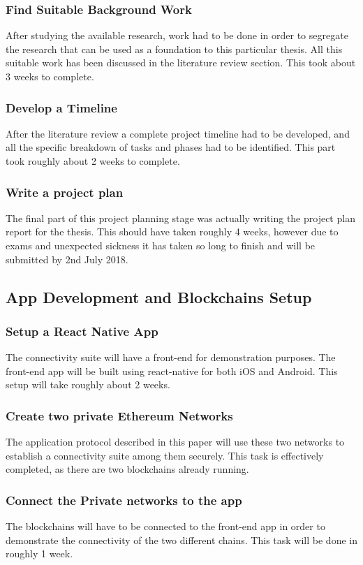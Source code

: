 \documentclass[a4paper,twoside,phd]{BYUPhys}
\begin{document}
\subsubsection{Find Suitable Background Work}
After studying the available research, work had to be done in order to segregate the research that can be used as a foundation to this particular thesis. All this suitable work has been discussed in the literature review section. This took about 3 weeks to complete.
\subsubsection{Develop a Timeline}
After the literature review a complete project timeline had to be developed, and all the specific breakdown of tasks and phases had to be identified. This part took roughly about 2 weeks to complete.
\subsubsection{Write a project plan}
The final part of this project planning stage was actually writing the project plan report for the thesis. This should have taken roughly 4 weeks, however due to exams and unexpected sickness it has taken so long to finish and will be submitted by 2nd July 2018.
\subsection{App Development and Blockchains Setup}
\subsubsection{Setup a React Native App}
The connectivity suite will have a front-end for
demonstration purposes. The front-end app will be built using react-native for both iOS and Android. This setup will take roughly about 2 weeks.
\subsubsection{Create two private Ethereum Networks}
The application protocol described in this paper will use these two networks to establish a connectivity suite among them securely. This task is effectively completed, as there are two blockchains already
running.
\subsubsection{Connect the Private networks to the app}
The blockchains will have to be
connected to the front-end app in order to demonstrate the connectivity of the two
different chains. This task will be done in roughly 1 week.
\end{document}
